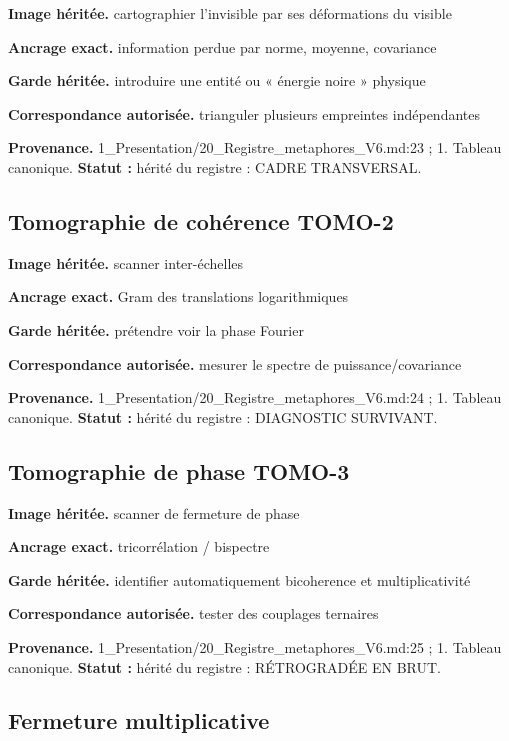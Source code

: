 \documentclass[
  9pt,
  a4paper,
]{article}
\begin{document}
\textbf{Image héritée.} cartographier l'invisible par ses déformations
du visible

\textbf{Ancrage exact.} information perdue par norme, moyenne,
covariance

\textbf{Garde héritée.} introduire une entité ou « énergie noire »
physique

\textbf{Correspondance autorisée.} trianguler plusieurs empreintes
indépendantes

\textbf{Provenance.} 1\_Presentation/20\_Registre\_metaphores\_V6.md:23
; 1. Tableau canonique. \textbf{Statut :} hérité du registre : CADRE
TRANSVERSAL.

\hypertarget{tomographie-de-cohuxe9rence-tomo-2}{%
\subsection{Tomographie de cohérence
TOMO-2}\label{tomographie-de-cohuxe9rence-tomo-2}}

\textbf{Image héritée.} scanner inter-échelles

\textbf{Ancrage exact.} Gram des translations logarithmiques

\textbf{Garde héritée.} prétendre voir la phase Fourier

\textbf{Correspondance autorisée.} mesurer le spectre de
puissance/covariance

\textbf{Provenance.} 1\_Presentation/20\_Registre\_metaphores\_V6.md:24
; 1. Tableau canonique. \textbf{Statut :} hérité du registre :
DIAGNOSTIC SURVIVANT.

\hypertarget{tomographie-de-phase-tomo-3}{%
\subsection{Tomographie de phase
TOMO-3}\label{tomographie-de-phase-tomo-3}}

\textbf{Image héritée.} scanner de fermeture de phase

\textbf{Ancrage exact.} tricorrélation / bispectre

\textbf{Garde héritée.} identifier automatiquement bicoherence et
multiplicativité

\textbf{Correspondance autorisée.} tester des couplages ternaires

\textbf{Provenance.} 1\_Presentation/20\_Registre\_metaphores\_V6.md:25
; 1. Tableau canonique. \textbf{Statut :} hérité du registre :
RÉTROGRADÉE EN BRUT.

\hypertarget{fermeture-multiplicative}{%
\subsection{Fermeture multiplicative}\label{fermeture-multiplicative}}
\end{document}

